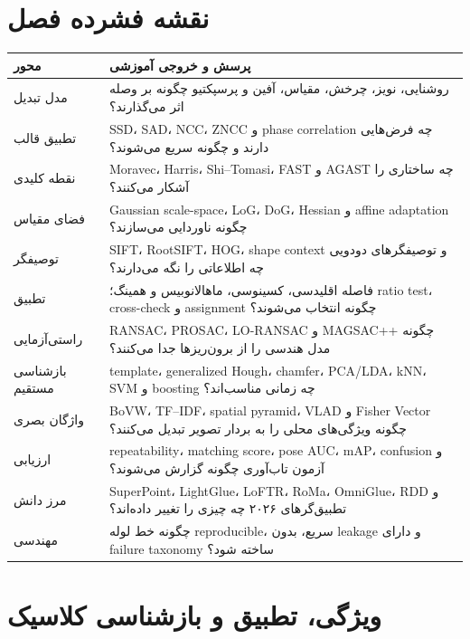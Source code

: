 \documentclass[12pt,openany,oneside]{book}
\begin{document}
\chapter*{نقشه فشرده فصل}
\begin{longtable}{p{35mm}p{104mm}}
\toprule
محور & پرسش و خروجی آموزشی \\
\midrule
مدل تبدیل & روشنایی، نویز، چرخش، مقیاس، آفین و پرسپکتیو چگونه بر وصله اثر می‌گذارند؟ \\
تطبیق قالب & SSD، SAD، NCC، ZNCC و phase correlation چه فرض‌هایی دارند و چگونه سریع می‌شوند؟ \\
نقطه کلیدی & Moravec، Harris، Shi--Tomasi، FAST و AGAST چه ساختاری را آشکار می‌کنند؟ \\
فضای مقیاس & Gaussian scale-space، LoG، DoG، Hessian و affine adaptation چگونه ناوردایی می‌سازند؟ \\
توصیفگر & SIFT، RootSIFT، HOG، shape context و توصیفگرهای دودویی چه اطلاعاتی را نگه می‌دارند؟ \\
تطبیق & فاصله اقلیدسی، کسینوسی، ماهالانوبیس و همینگ؛ ratio test، cross-check و assignment چگونه انتخاب می‌شوند؟ \\
راستی‌آزمایی & RANSAC، PROSAC، LO-RANSAC و MAGSAC++ چگونه مدل هندسی را از برون‌ریزها جدا می‌کنند؟ \\
بازشناسی مستقیم & template، generalized Hough، chamfer، PCA/LDA، kNN، SVM و boosting چه زمانی مناسب‌اند؟ \\
واژگان بصری & BoVW، TF--IDF، spatial pyramid، VLAD و Fisher Vector چگونه ویژگی‌های محلی را به بردار تصویر تبدیل می‌کنند؟ \\
ارزیابی & repeatability، matching score، pose AUC، mAP، confusion و آزمون تاب‌آوری چگونه گزارش می‌شوند؟ \\
مرز دانش & SuperPoint، LightGlue، LoFTR، RoMa، OmniGlue، RDD و تطبیق‌گرهای ۲۰۲۶ چه چیزی را تغییر داده‌اند؟ \\
مهندسی & چگونه خط لوله reproducible، سریع، بدون leakage و دارای failure taxonomy ساخته شود؟ \\
\bottomrule
\end{longtable}

\tableofcontents
\mainmatter
\setcounter{chapter}{8}
\chapter{ویژگی، تطبیق و بازشناسی کلاسیک}
\end{document}
